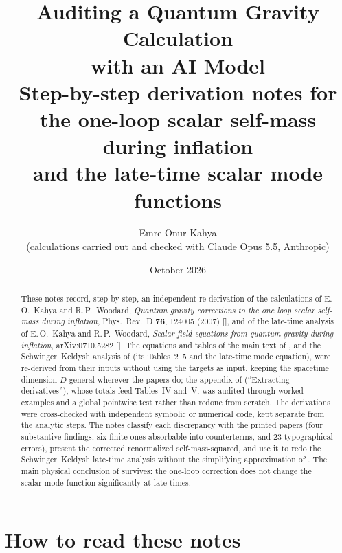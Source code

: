\documentclass[11pt]{report}
\title{\textbf{Auditing a Quantum Gravity Calculation\\ with an AI Model}\\[6pt]
\large Step-by-step derivation notes for the one-loop scalar self-mass during inflation\\
and the late-time scalar mode functions}
\author{Emre Onur Kahya\\[2pt]\small (calculations carried out and checked with Claude Opus 5.5, Anthropic)}
\date{October 2026}
\numberwithin{equation}{chapter}
\begin{document}
\maketitle
\begin{abstract}
These notes record, step by step, an independent re-derivation of the calculations of
E.\,O.~Kahya and R.\,P.~Woodard, \emph{Quantum gravity corrections to the one loop scalar self-mass during inflation},
Phys.\ Rev.\ D \textbf{76}, 124005 (2007) [\PI], and of the late-time analysis of
E.\,O.~Kahya and R.\,P.~Woodard, \emph{Scalar field equations from quantum gravity during inflation}, arXiv:0710.5282 [\PII].
The equations and tables of the main text of \PI, and the Schwinger--Keldysh analysis of \PII{} (its Tables~2--5 and the late-time mode equation),
were re-derived from their inputs without using the targets as input, keeping the spacetime dimension $D$ general wherever
the papers do; the appendix of \PI{} (``Extracting derivatives''), whose totals feed Tables~IV and~V, was audited through worked examples and a global pointwise test rather than redone from scratch.
The derivations were cross-checked with independent symbolic or numerical code, kept separate from the analytic steps.
The notes classify each discrepancy with the printed papers (four substantive findings, six finite ones absorbable into counterterms,
and 23 typographical errors), present the corrected renormalized self-mass-squared, and use it to redo the Schwinger--Keldysh late-time analysis without the
simplifying approximation of \PII. The main physical conclusion of \PII{} survives: the one-loop correction does not change the
scalar mode function significantly at late times.
\end{abstract}
\tableofcontents

\chapter*{How to read these notes}
\end{document}
